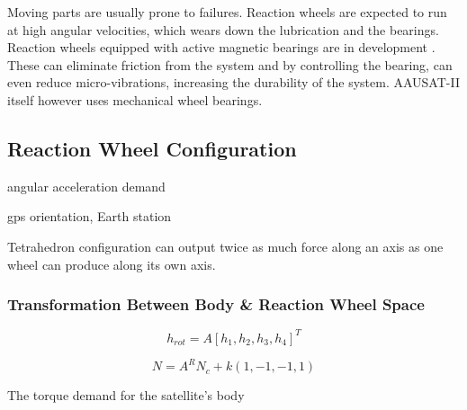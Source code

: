 Moving parts are usually prone to failures. Reaction wheels are expected to run at high angular velocities, which wears down the lubrication and the bearings. Reaction wheels equipped with active magnetic bearings are in development \cite{MagneticReactWheel}. These can eliminate friction from the system and by controlling the bearing, can even reduce micro-vibrations, increasing the durability of the system. AAUSAT-II itself however uses mechanical wheel bearings.

\subsection{Reaction Wheel Configuration}

angular acceleration demand \cite{ReactionWheelConfigSim} \cite{ReactConfigThesis}

gps orientation, Earth station

Tetrahedron configuration can output twice as much force along an axis as one wheel can produce along its own axis.

\subsubsection{Transformation Between Body \& Reaction Wheel Space}

\cite[equation 18.41-42]{SADC}

\begin{equation}
h_{rot} = A\left[ h_1, h_2, h_3, h_4 \right]^T
\end{equation}

\begin{equation}
N = A^R \textbf{$N_c$} + k\left(1,-1,-1,1\right)
\end{equation}


The torque demand for the satellite's body





